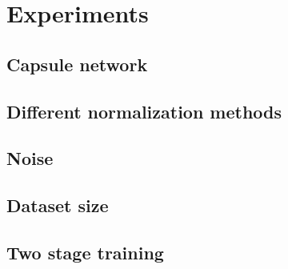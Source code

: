 \chapter{Experiments}
\label{Experiments}

\section{Capsule network}
\section{Different normalization methods}
\section{Noise}
\label{s:experiment-noise}
\section{Dataset size}
\section{Two stage training}
